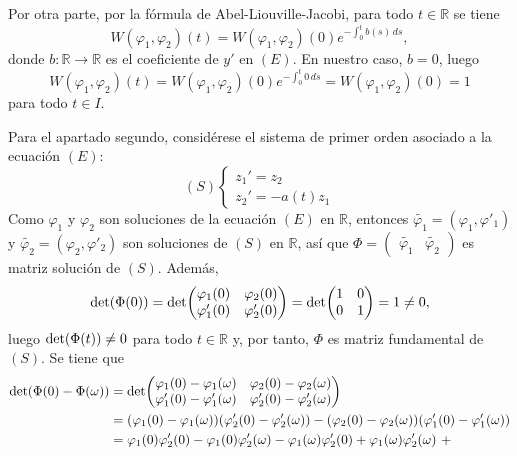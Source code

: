 \documentclass[11pt]{report}
\newcommand{\R}{\mathbb R}
\begin{document}
\begin{itemize}
Por otra parte, por la fórmula de Abel-Liouville-Jacobi, para todo $t \in \R$ se tiene
\[W(\varphi_1,\varphi_2)(t)=W(\varphi_1,\varphi_2)(0)e^{-\int_0^t b(s)\, ds},\]
donde $b \colon \R \to \R$ es el coeficiente de $y'$ en $(E)$. En nuestro caso, $b=0$, luego
\[W(\varphi_1,\varphi_2)(t)=W(\varphi_1,\varphi_2)(0)e^{-\int_0^t 0\, ds} = W(\varphi_1,\varphi_2)(0)=1\]
para todo $t \in I$.

\vspace{2mm}

Para el apartado segundo, considérese el sistema de primer orden asociado a la ecuación $(E)$:
\[(S) \begin{cases}
    z_1'=z_2 \\
    z_2'=-a(t)z_1
\end{cases}\]
Como $\varphi_1$ y $\varphi_2$ son soluciones de la ecuación $(E)$ en $\R$, entonces $\widetilde{\varphi_1}=(\varphi_1,\varphi'_1)$ y $\widetilde{\varphi_2}=(\varphi_2,\varphi'_2)$ son soluciones de $(S)$ en $\R$, así que $\Phi=\begin{pmatrix}
    \widetilde{\varphi_1} & \widetilde{\varphi_2}
\end{pmatrix}$ es matriz solución de $(S)$. Además,
\[\textup{det}(\Phi(0))=\textup{det}\biggl(\begin{matrix}
    \varphi_1(0) & \varphi_2(0) \\
    \varphi'_1(0) & \varphi'_2(0)
\end{matrix}\biggr)=\textup{det}\biggl(\begin{matrix}
    1 & 0 \\
    0 & 1
\end{matrix}\biggr)=1 \neq 0,\]
luego $\textup{det}(\Phi(t))\neq 0$ para todo $t \in \R$ y, por tanto, $\Phi$ es matriz fundamental de $(S)$. Se tiene que
\[\begin{aligned}[t]
    \textup{det}(\Phi(0)-\Phi(\omega))&=\textup{det}\biggl(\begin{matrix}
    \varphi_1(0)-\varphi_1(\omega) & \varphi_2(0)-\varphi_2(\omega) \\
    \varphi_1'(0)-\varphi_1'(\omega) & \varphi_2'(0)-\varphi_2'(\omega)
\end{matrix}\biggr) \\
&=(\varphi_1(0)-\varphi_1(\omega))(\varphi_2'(0)-\varphi_2'(\omega))-(\varphi_2(0)-\varphi_2(\omega))(\varphi_1'(0)-\varphi_1'(\omega)) \\
&=\begin{aligned}[t]
    &\varphi_1(0)\varphi_2'(0)-\varphi_1(0)\varphi_2'(\omega)-\varphi_1(\omega)\varphi_2'(0)+\varphi_1(\omega)\varphi_2'(\omega) \ + \\

\end{aligned}
\end{aligned}\]
\end{itemize}
\end{document}
